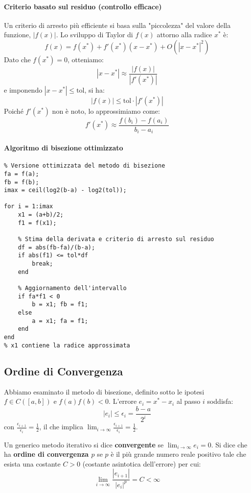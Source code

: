 \paragraph{Criterio basato sul residuo (controllo efficace)}
Un criterio di arresto più efficiente si basa sulla "piccolezza" del valore della funzione, $|f(x)|$.  
Lo sviluppo di Taylor di $f(x)$ attorno alla radice $x^*$ è:
\[
f(x) = f(x^*) + f'(x^*)(x-x^*) + O(|x-x^*|^2)
\]
Dato che $f(x^*)=0$, otteniamo:
\[
|x-x^*| \approx \frac{|f(x)|}{|f'(x^*)|}
\]
e imponendo $|x-x^*| \le \text{tol}$, si ha:
\[
|f(x)| \le \text{tol} \cdot |f'(x^*)|
\]
Poiché $f'(x^*)$ non è noto, lo approssimiamo come:
\[
f'(x^*) \approx \frac{f(b_i)-f(a_i)}{b_i - a_i}
\]

\paragraph{Algoritmo di bisezione ottimizzato}
\begin{lstlisting}
% Versione ottimizzata del metodo di bisezione
fa = f(a);
fb = f(b);
imax = ceil(log2(b-a) - log2(tol));

for i = 1:imax
    x1 = (a+b)/2;
    f1 = f(x1);
    
    % Stima della derivata e criterio di arresto sul residuo
    df = abs(fb-fa)/(b-a);
    if abs(f1) <= tol*df
        break;
    end
    
    % Aggiornamento dell'intervallo
    if fa*f1 < 0
        b = x1; fb = f1;
    else
        a = x1; fa = f1;
    end
end
% x1 contiene la radice approssimata
\end{lstlisting}


\subsection{Ordine di Convergenza}
Abbiamo esaminato il metodo di bisezione, definito sotto le ipotesi $f \in C([a,b])$ e $f(a)f(b)<0$. L'errore $e_i = x^* - x_i$ al passo $i$ soddisfa:
$$ |e_i| \le \epsilon_i = \frac{b-a}{2^i} $$
con $\frac{\epsilon_{i+1}}{\epsilon_i} = \frac{1}{2}$, il che implica $\lim_{i \to \infty} \frac{\epsilon_{i+1}}{\epsilon_i} = \frac{1}{2}$.

\begin{definition}
Un generico metodo iterativo si dice \textbf{convergente} se $\lim_{i \to \infty} e_i = 0$.
Si dice che ha \textbf{ordine di convergenza $p$} se $p$ è il più grande numero reale positivo tale che esista una costante $C > 0$ (costante asintotica dell'errore) per cui:
$$ \lim_{i \to \infty} \frac{|e_{i+1}|}{|e_i|^p} = C < \infty $$
\end{definition}


